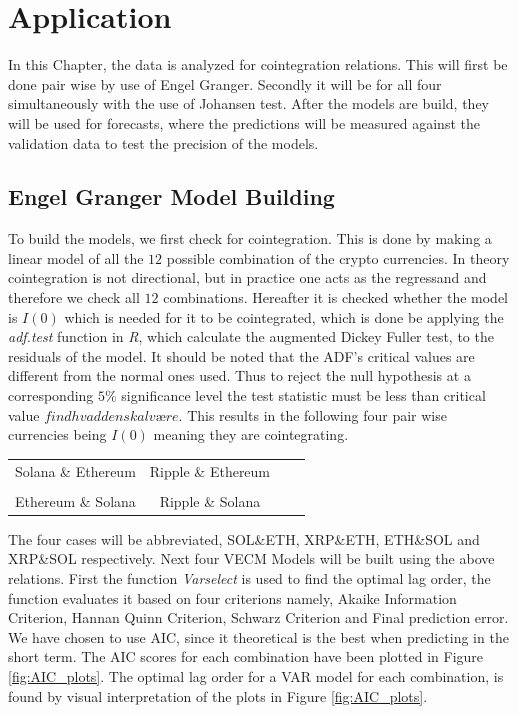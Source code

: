 \chapter{Application}
In this Chapter, the data is analyzed for cointegration relations. This will first be done pair wise by use of Engel Granger. Secondly it will be for all four simultaneously with the use of Johansen test. After the models are build, they will be used for forecasts, where the predictions will be measured against the validation data to test the precision of the models.


\section{Engel Granger Model Building}
To build the models, we first check for cointegration. This is done by making a linear model of all the $12$ possible combination of the crypto currencies. In theory cointegration is not directional, but in practice one acts as the regressand and therefore we check all $12$ combinations. Hereafter it is checked whether the model is $I(0)$ which is needed for it to be cointegrated, which is done be applying the \textit{adf.test} function in \textit{R}, which calculate the augmented Dickey Fuller test, to the residuals of the model. It should be noted that the ADF's critical values are different from the normal ones used. Thus to reject the null hypothesis at a corresponding $5\%$ significance level the test statistic must be less than critical value $find hvad den skal være$. This results in the following four pair wise currencies being $I(0)$ meaning they are cointegrating. 
\pause
\begin{center}
\begin{tabular}{cccc}
   Solana \& Ethereum \quad & \quad Ripple \& Ethereum\\\\
   Ethereum \& Solana \quad & \quad Ripple \& Solana
\end{tabular}
\end{center}
\pause
\noindent The four cases will be abbreviated, SOL\&ETH, XRP\&ETH, ETH\&SOL and XRP\&SOL respectively. Next four VECM Models will be built using the above relations. First the function \textit{Varselect} is used to find the optimal lag order, the function evaluates it based on four criterions namely, Akaike Information Criterion, Hannan Quinn Criterion, Schwarz Criterion and Final prediction error. We have chosen to use AIC, since it theoretical is the best when predicting in the short term. The AIC scores for each combination have been plotted in Figure \ref{fig:AIC_plots}. The optimal lag order for a VAR model for each combination, is found by visual interpretation of the plots in Figure \ref{fig:AIC_plots}.
